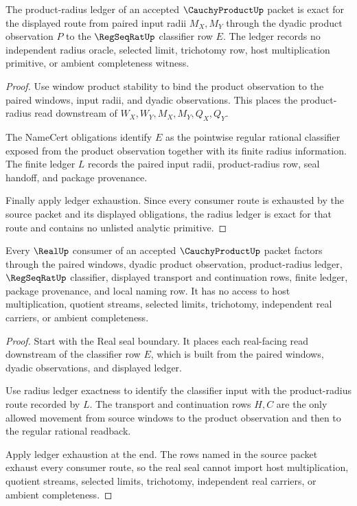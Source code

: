 \begin{theorem}
\label{thm:cauchy-product-radius-ledger-exactness}
The product-radius ledger of an accepted $\CauchyProductUp$ packet is exact for the displayed route from paired input radii $M_X,M_Y$ through the dyadic product observation $P$ to the $\RegSeqRatUp$ classifier row $E$. The ledger records no independent radius oracle, selected limit, trichotomy row, host multiplication primitive, or ambient completeness witness.
\end{theorem}
\begin{proof}
Use window product stability to bind the product observation to the paired windows, input radii, and dyadic observations. This places the product-radius read downstream of $W_X,W_Y,M_X,M_Y,Q_X,Q_Y$.

The NameCert obligations identify $E$ as the pointwise regular rational classifier exposed from the product observation together with its finite radius information. The finite ledger $L$ records the paired input radii, product-radius row, seal handoff, and package provenance.

Finally apply ledger exhaustion. Since every consumer route is exhausted by the source packet and its displayed obligations, the radius ledger is exact for that route and contains no unlisted analytic primitive.
\end{proof}

\begin{theorem}
\label{thm:cauchy-product-real-seal-consumer-exhaustion}
Every $\RealUp$ consumer of an accepted $\CauchyProductUp$ packet factors through the paired windows, dyadic product observation, product-radius ledger, $\RegSeqRatUp$ classifier, displayed transport and continuation rows, finite ledger, package provenance, and local naming row. It has no access to host multiplication, quotient streams, selected limits, trichotomy, independent real carriers, or ambient completeness.
\end{theorem}
\begin{proof}
Start with the Real seal boundary. It places each real-facing read downstream of the classifier row $E$, which is built from the paired windows, dyadic observations, and displayed ledger.

Use radius ledger exactness to identify the classifier input with the product-radius route recorded by $L$. The transport and continuation rows $H,C$ are the only allowed movement from source windows to the product observation and then to the regular rational readback.

Apply ledger exhaustion at the end. The rows named in the source packet exhaust every consumer route, so the real seal cannot import host multiplication, quotient streams, selected limits, trichotomy, independent real carriers, or ambient completeness.
\end{proof}

